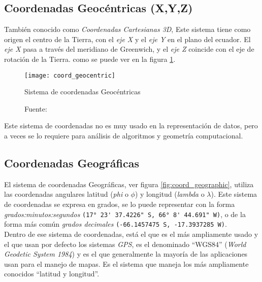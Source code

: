     \subsection{Coordenadas Geocéntricas (X,Y,Z)} %
      \label{sub:coordenadas_geocentricas}
        También conocido como \emph{Coordenadas Cartesianas 3D}, Este sistema tiene como origen el centro de la Tierra, con el \emph{eje X} y el \emph{eje Y} en el plano del ecuador. El \emph{eje X} pasa a través del meridiano de Greenwich, y el \emph{eje Z}  coincide con el eje de rotación de la Tierra. como se puede ver en la figura \ref{fig:coord_geocentric}.

        \begin{figure}[!ht]
          \begin{center}
            \texttt{[image: coord\_geocentric]}
            \caption{Sistema de coordenadas Geocéntricas}
            \label{fig:coord_geocentric}
            \caption*{Fuente: \cite{coords2009} }
          \end{center}
        \end{figure}

        Este sistema de coordenadas no es muy usado en la representación de datos, pero a veces se lo requiere para análisis de algoritmos y geometría computacional.

      \subsection{Coordenadas Geográficas} %
      \label{sub:coordenadas_geograficas}
        El sistema de coordenadas Geográficas, ver figura \ref{fig:coord_geographic}, utiliza las coordenadas angulares latitud  (\emph{phi} o ${\phi}$) y longitud (\emph{lambda} o ${\lambda}$). Este sistema de coordenadas se expresa en grados, se lo puede representar con la forma \emph{grados:minutos:segundos }\verb|(17° 23' 37.4226" S, 66° 8' 44.691" W)|, o de la forma más común \emph{grados decimales} \verb|(-66.1457475 S, -17.3937285 W)|. \\

  Dentro de ese sistema de coordenadas, está el que es el más ampliamente usado y el que usan por defecto los sistemas \emph{GPS}, es el denominado ``WGS84'' (\emph{World Geodetic System 1984}) y es el que generalmente la mayoría de las aplicaciones usan para el manejo de mapas. Es el sistema que maneja los más ampliamente conocidos ``latitud y longitud''.\\


